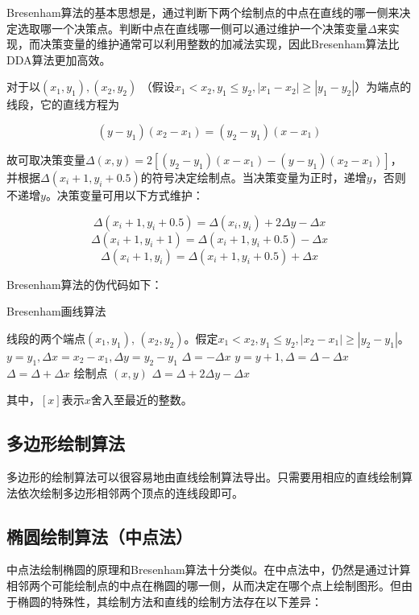 \documentclass[a4paper,12pt]{article}
\begin{document}
Bresenham算法的基本思想是，通过判断下两个绘制点的中点在直线的哪一侧来决定选取哪一个决策点。判断中点在直线哪一侧可以通过维护一个决策变量$\Delta$来实现，而决策变量的维护通常可以利用整数的加减法实现\cite{wiki:Bresenham}，因此Bresenham算法比DDA算法更加高效。

对于以$(x_1, y_1), (x_2, y_2)$ （假设$x_1 < x_2, y_1 \leq y_2, |x_1 - x_2| \geq |y_1 - y_2|$）为端点的线段，它的直线方程为

$$ (y - y_1) (x_2 - x_1) = (y_2 - y_1)(x - x_1) $$

故可取决策变量$\Delta(x, y) = 2[(y_2 - y_1)(x - x_1) - (y - y_1)(x_2 - x_1)]$，并根据$\Delta(x_i+1, y_i+0.5)$的符号决定绘制点。当决策变量为正时，递增$y$，否则不递增$y$。决策变量可用以下方式维护：

$$ \Delta(x_i+1, y_i+0.5) = \Delta(x_i, y_i) + 2\Delta y - \Delta x $$
$$ \Delta(x_i+1, y_i+1) = \Delta(x_i+1, y_i+0.5) - \Delta x $$
$$ \Delta(x_i+1, y_i) = \Delta(x_i+1, y_i+0.5) + \Delta x $$

Bresenham算法的伪代码如下：

\begin{algorithm}[htb] 
\caption{Bresenham画线算法} 
\label{alg:Bresenham} 
\begin{algorithmic}[1] 
\Require 
线段的两个端点$(x_1, y_1)$, $(x_2, y_2)$。假定$x_1 < x_2, y_1 \leq y_2, |x_2 - x_1| \geq |y_2 - y_1|$。
\State $y = y_1, \Delta x = x_2 - x_1, \Delta y = y_2 - y_1$
\State $\Delta = -\Delta x$
	\State $y = y + 1, \Delta = \Delta - \Delta x$ 
	\Else
	\State $\Delta = \Delta + \Delta x$
	\EndIf
    \State 绘制点 $(x, y)$
    \State $\Delta = \Delta + 2\Delta y - \Delta x$
\EndFor
\end{algorithmic} 
\end{algorithm}

其中，$[x]$表示$x$舍入至最近的整数。

\subsection{多边形绘制算法}
多边形的绘制算法可以很容易地由直线绘制算法导出。只需要用相应的直线绘制算法依次绘制多边形相邻两个顶点的连线段即可。


\subsection{椭圆绘制算法（中点法）}
中点法\cite{wiki:Midpoint}绘制椭圆的原理和Bresenham算法十分类似。在中点法中，仍然是通过计算相邻两个可能绘制点的中点在椭圆的哪一侧，从而决定在哪个点上绘制图形。但由于椭圆的特殊性，其绘制方法和直线的绘制方法存在以下差异：
\end{document}
